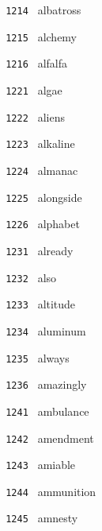 \documentclass[11pt]{article}
\begin{document}
\begin{multicols}{6}
\noindent \texttt{ 1214 } \hspace{1mm} albatross  \par
\noindent \texttt{ 1215 } \hspace{1mm} alchemy  \par
\noindent \texttt{ 1216 } \hspace{1mm} alfalfa  \par
\noindent \texttt{ 1221 } \hspace{1mm} algae  \par
\noindent \texttt{ 1222 } \hspace{1mm} aliens  \par
\noindent \texttt{ 1223 } \hspace{1mm} alkaline  \par
\noindent \texttt{ 1224 } \hspace{1mm} almanac  \par
\noindent \texttt{ 1225 } \hspace{1mm} alongside  \par
\noindent \texttt{ 1226 } \hspace{1mm} alphabet  \par
\noindent \texttt{ 1231 } \hspace{1mm} already  \par
\noindent \texttt{ 1232 } \hspace{1mm} also  \par
\noindent \texttt{ 1233 } \hspace{1mm} altitude  \par
\noindent \texttt{ 1234 } \hspace{1mm} aluminum  \par
\noindent \texttt{ 1235 } \hspace{1mm} always  \par
\noindent \texttt{ 1236 } \hspace{1mm} amazingly  \par
\noindent \texttt{ 1241 } \hspace{1mm} ambulance  \par
\noindent \texttt{ 1242 } \hspace{1mm} amendment  \par
\noindent \texttt{ 1243 } \hspace{1mm} amiable  \par
\noindent \texttt{ 1244 } \hspace{1mm} ammunition  \par
\noindent \texttt{ 1245 } \hspace{1mm} amnesty  \par

\end{multicols}
\end{document}
